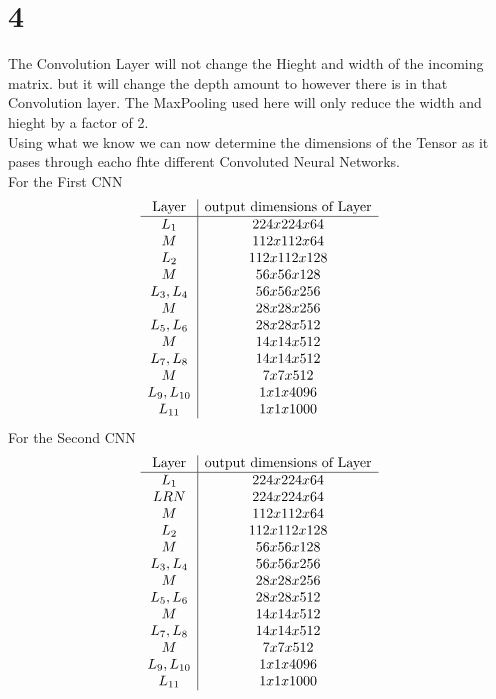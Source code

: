 \documentclass[12pt,english]{article}
\begin{document}
\section*{4}
The Convolution Layer will not change the Hieght and width of the incoming matrix. but it will change the depth amount to however there is in that Convolution layer. The MaxPooling used here will only reduce the width and hieght by a factor of 2.\\
Using what we know we can now determine the dimensions of the Tensor as it pases through eacho fhte different Convoluted Neural Networks.\\
For the First CNN
\begin{equation*}
\begin{array}{c|c}
 \hbox{Layer}& \hbox{output dimensions of Layer}  \\
\hline
L_1 & 224x224x64 \\
M & 112x112x64 \\
L_2 & 112x112x128 \\
M & 56x56x128 \\
L_3,L_4 & 56x56x256 \\
M & 28x28x256\\
L_5,L_6 & 28x28x512 \\
M & 14x14x512\\
L_7,L_8 & 14x14x512 \\
M & 7x7x512\\
L_9,L_{10} & 1x1x4096 \\
L_{11} & 1x1x1000 
\end{array} 
\end{equation*}
For the Second CNN
\begin{equation*}
\begin{array}{c|c}
 \hbox{Layer}& \hbox{output dimensions of Layer}  \\
\hline
L_1 & 224x224x64 \\
LRN & 224x224x64 \\
M & 112x112x64 \\
L_2 & 112x112x128 \\
M & 56x56x128 \\
L_3,L_4 & 56x56x256 \\
M & 28x28x256\\
L_5,L_6 & 28x28x512 \\
M & 14x14x512\\
L_7,L_8 & 14x14x512 \\
M & 7x7x512\\
L_9,L_{10} & 1x1x4096 \\
L_{11} & 1x1x1000 
\end{array} 
\end{equation*}
\end{document}
